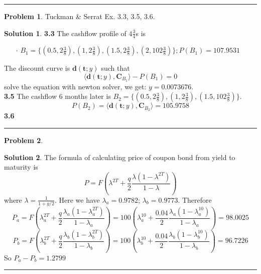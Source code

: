 \documentclass[a4paper, 10pt]{article}
\theoremstyle{definition}
\newtheorem{problem}{Problem}
\theoremstyle{hSol}
\newtheorem*{solution}{Solution}
\begin{document}
\noindent\rule{16cm}{0.4pt}

\begin{problem} Tuckman \& Serrat Ex. 3.3, 3.5, 3.6.
\end{problem}
\begin{solution} \textbf{3.3} The cashflow profile of $4\tfrac{3}{4}$s is 
\begin{itemize}
  \item[$\cdot$] $B_1 = \{(0.5, 2\tfrac{3}{8}), (1, 2\tfrac{3}{8}), (1.5, 2\tfrac{3}{8}), (2, 102\tfrac{3}{8})\}; P(B_1) = 107.9531$
\end{itemize}
The discount curve is $\bm{d}(\bm{t}; y)$ such that 
$$
\langle\bm{d}(\bm{t}; y), \bm{C}_{B_1} \rangle - P(B_1) = 0
$$
solve the equation with newton solver, we get: $y=0.0073676$. \\
\textbf{3.5} The cashflow 6 months later is $B_2 = \{(0.5, 2\tfrac{3}{8}), (1, 2\tfrac{3}{8}), (1.5, 102\tfrac{3}{8})\}$. 
$$
P(B_2) = \langle\bm{d}(\bm{t}; y), \bm{C}_{B_2} \rangle = 105.9758
$$
\textbf{3.6} 
\end{solution}
\noindent\rule{16cm}{0.4pt}

\begin{problem} 
\end{problem}
\begin{solution} The formula of calculating price of coupon bond from yield to maturity is
$$
P = F\left(\lambda^{2T} + \frac{q}{2}\frac{\lambda (1-  \lambda^{2T})}{1- \lambda}\right)
$$
where $\lambda = \frac{1}{1+y/2}$. Here we have $\lambda_a = 0.9782$; $\lambda_b = 0.9773$. Therefore
$$
P_a = F\left(\lambda_a^{2T} + \frac{q}{2}\frac{\lambda_a (1-  \lambda_a^{2T})}{1- \lambda_a}\right) = 100\left(\lambda_a^{10} + \frac{0.04}{2}\frac{\lambda_a (1-  \lambda_a^{10})}{1- \lambda_a}\right) = 98.0025
$$
$$
P_b = F\left(\lambda_b^{2T} + \frac{q}{2}\frac{\lambda_b (1-  \lambda_b^{2T})}{1- \lambda_b}\right) = 100\left(\lambda_b^{10} + \frac{0.04}{2}\frac{\lambda_b (1-  \lambda_b^{10})}{1- \lambda_b}\right) = 96.7226
$$
So $P_a - P_b = 1.2799$
\end{solution}
\noindent\rule{16cm}{0.4pt}
\end{document}

